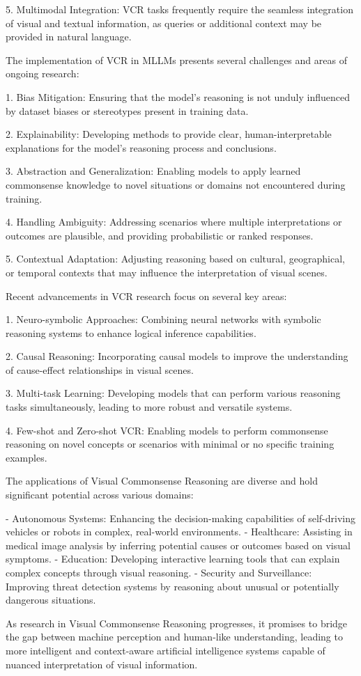 5. Multimodal Integration: VCR tasks frequently require the seamless integration of visual and textual information, as queries or additional context may be provided in natural language.

The implementation of VCR in MLLMs presents several challenges and areas of ongoing research:

1. Bias Mitigation: Ensuring that the model's reasoning is not unduly influenced by dataset biases or stereotypes present in training data.

2. Explainability: Developing methods to provide clear, human-interpretable explanations for the model's reasoning process and conclusions.

3. Abstraction and Generalization: Enabling models to apply learned commonsense knowledge to novel situations or domains not encountered during training.

4. Handling Ambiguity: Addressing scenarios where multiple interpretations or outcomes are plausible, and providing probabilistic or ranked responses.

5. Contextual Adaptation: Adjusting reasoning based on cultural, geographical, or temporal contexts that may influence the interpretation of visual scenes.

Recent advancements in VCR research focus on several key areas:

1. Neuro-symbolic Approaches: Combining neural networks with symbolic reasoning systems to enhance logical inference capabilities.

2. Causal Reasoning: Incorporating causal models to improve the understanding of cause-effect relationships in visual scenes.

3. Multi-task Learning: Developing models that can perform various reasoning tasks simultaneously, leading to more robust and versatile systems.

4. Few-shot and Zero-shot VCR: Enabling models to perform commonsense reasoning on novel concepts or scenarios with minimal or no specific training examples.

The applications of Visual Commonsense Reasoning are diverse and hold significant potential across various domains:

- Autonomous Systems: Enhancing the decision-making capabilities of self-driving vehicles or robots in complex, real-world environments.
- Healthcare: Assisting in medical image analysis by inferring potential causes or outcomes based on visual symptoms.
- Education: Developing interactive learning tools that can explain complex concepts through visual reasoning.
- Security and Surveillance: Improving threat detection systems by reasoning about unusual or potentially dangerous situations.

As research in Visual Commonsense Reasoning progresses, it promises to bridge the gap between machine perception and human-like understanding, leading to more intelligent and context-aware artificial intelligence systems capable of nuanced interpretation of visual information.



